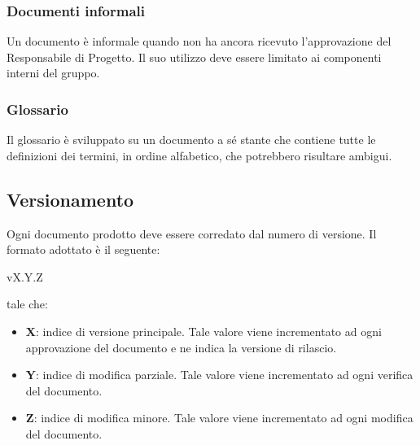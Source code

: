 \subsubsection{Documenti informali}
Un documento è informale quando non ha ancora ricevuto l'approvazione del Responsabile di Progetto. Il suo utilizzo deve essere limitato ai componenti interni del gruppo.

\subsubsection{Glossario}
Il glossario è sviluppato su un documento a sé stante che contiene tutte le definizioni dei termini, in ordine alfabetico, che potrebbero risultare ambigui.

\subsection{Versionamento}
Ogni documento prodotto deve essere corredato dal numero di versione. Il formato adottato è il seguente:
\begin{center}
	vX.Y.Z
\end{center}
tale che:
\begin{itemize}
	\item \textbf{X}: indice di versione principale. Tale valore viene incrementato ad ogni approvazione del documento e ne indica la versione di rilascio.
	\item \textbf{Y}: indice di modifica parziale. Tale valore viene incrementato ad ogni verifica del documento.
	\item \textbf{Z}: indice di modifica minore. Tale valore viene incrementato ad ogni modifica del documento.
\end{itemize}

